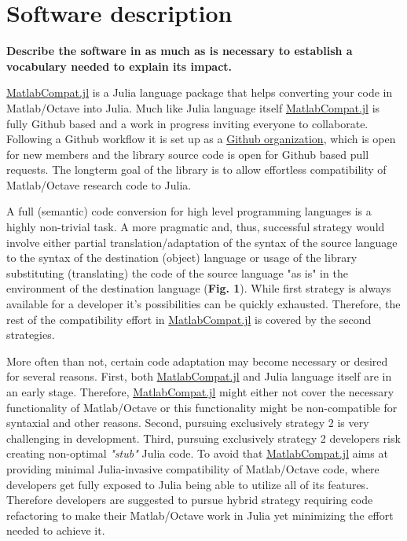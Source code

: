 \section{Software description}


\textbf{Describe the software in as much as is necessary to establish a vocabulary needed to explain its impact. }

\href{https://github.com/MatlabCompat/MatlabCompat.jl}{MatlabCompat.jl} is a Julia language package that helps converting your code in Matlab/Octave into Julia. Much like Julia language itself \href{https://github.com/MatlabCompat/MatlabCompat.jl}{MatlabCompat.jl} is fully Github based and a work in progress inviting everyone to collaborate. Following a Github workflow it is set up as a \href{https://github.com/MatlabCompat}{Github organization}, which is open for new members and the library source code is open for Github based pull requests. The longterm goal of the library is to allow effortless compatibility of Matlab/Octave research code to Julia.

A full (semantic) code conversion for high level programming languages is a highly non-trivial task. A more pragmatic and, thus, successful strategy would involve either partial translation/adaptation of the syntax of the source language to the syntax of the destination (object) language \cite{Ledley_1962} or usage of the library substituting (translating) the code of the source language "as is" in the environment of the destination language (\textbf{Fig. 1}). While first strategy is always available for a developer it's possibilities can be quickly exhausted. Therefore, the rest of the compatibility effort in \href{https://github.com/MatlabCompat/MatlabCompat.jl}{MatlabCompat.jl} is covered by the second strategies.

More often than not, certain code adaptation may become necessary or desired for several reasons. First,  both \href{https://github.com/MatlabCompat/MatlabCompat.jl}{MatlabCompat.jl} and Julia language itself are in an early stage. Therefore, \href{https://github.com/MatlabCompat/MatlabCompat.jl}{MatlabCompat.jl} might either not cover the necessary functionality of Matlab/Octave or this functionality might be non-compatible for syntaxial and other reasons. Second, pursuing exclusively strategy 2 is very challenging in development. Third, pursuing exclusively strategy 2 developers risk creating non-optimal \textit{"stub"} Julia code. To avoid that \href{https://github.com/MatlabCompat/MatlabCompat.jl}{MatlabCompat.jl} aims at providing minimal Julia-invasive compatibility of Matlab/Octave code, where developers get fully exposed to Julia being able to utilize all of its features. Therefore developers are suggested to pursue hybrid strategy requiring code refactoring to make their Matlab/Octave work in Julia yet minimizing the effort needed to achieve it.

